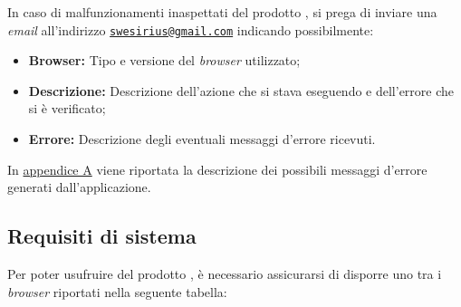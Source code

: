 In caso di malfunzionamenti inaspettati del prodotto \progetto{}, si prega di inviare una \textit{email} all'indirizzo
\href{mailto:swesirius@gmail.com}{\nolinkurl{swesirius@gmail.com}} indicando possibilmente:

\begin{itemize}
\item \textbf{Browser:} Tipo e versione del \textit{browser} utilizzato;
\item \textbf{Descrizione:} Descrizione dell'azione che si stava eseguendo e dell'errore che si è verificato;
\item \textbf{Errore:} Descrizione degli eventuali messaggi d'errore ricevuti.
\end{itemize}

In \hyperref[errori]{appendice A} viene riportata la descrizione dei possibili messaggi d'errore generati dall'applicazione.

\subsection{Requisiti di sistema}
Per poter usufruire del prodotto \progetto{}, è necessario assicurarsi di disporre uno tra i \textit{browser} riportati nella seguente tabella:

